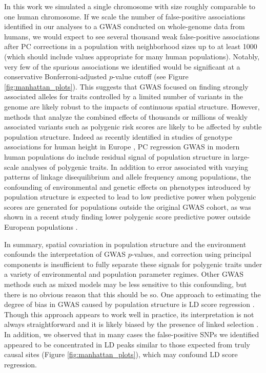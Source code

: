 \documentclass[10pt,twoside,lineno,hidelinks]{preprint}
\begin{document}
In this work we simulated a single chromosome with size roughly comparable to one human chromosome. If we scale the number of false-positive associations identified in our analyses to a GWAS conducted on whole-genome data from humans, we would expect to see several thousand weak false-positive associations after PC corrections in a population with neighborhood sizes up to at least 1000 (which should include values appropriate for many human populations). Notably, very few of the spurious associations we identified would be significant at a conservative Bonferroni-adjusted $p$-value cutoff (see Figure \ref{fig:manhattan_plots}). This suggests that GWAS focused on finding strongly associated alleles for traits controlled by a limited number of variants in the genome are likely robust to the impacts of continuous spatial structure. However, methods that analyze the combined effects of thousands or millions of weakly associated variants such as polygenic risk scores \citep{wray2007prediction,international2009common} are likely to be affected by subtle population structure. 
Indeed as recently identified in studies of genotype associations for human height in Europe \citep{Berg2018,Sohail2018}, 
PC regression GWAS in modern human populations do include residual signal of population structure in large-scale analyses of polygenic traits. In addition to error associated with varying patterns of linkage disequilibrium and allele frequency among populations, the confounding of environmental and genetic effects on phenotypes introduced by population structure is expected to lead to low predictive power when polygenic scores are generated for populations outside the original GWAS cohort, 
as was shown in a recent study finding lower polygenic score predictive power outside European populations \citep{Martin2019}.

In summary, spatial covariation in population structure and the environment confounds the interpretation of GWAS $p$-values, and correction using principal components is insufficient to fully separate these signals for polygenic traits under a variety of environmental and population parameter regimes. 
Other GWAS methods such as mixed models \citep{Kang2008}  may be less sensitive to this confounding, but there is no obvious reason that this should be so. 
One approach to estimating the degree of bias in GWAS caused by population structure is LD score regression \citep{Bulik-Sullivan2015}. 
Though this approach appears to work well in practice, its interpretation is not always straightforward and it is likely biased by the presence of linked selection \citep{Berg2018}. In addition, we observed that in many cases the false-positive SNPs we identified appeared to be concentrated in LD peaks similar to those expected from truly causal sites (Figure \ref{fig:manhattan_plots}), which may confound LD score regression.
\end{document}
